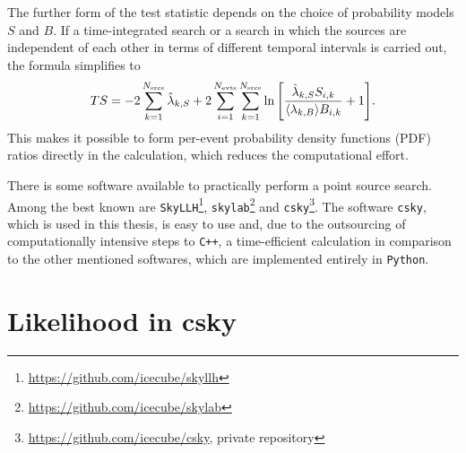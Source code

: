 The further form of the test statistic depends on the choice of probability models $S$ and $B$.
If a time-integrated search or a search in which the sources are independent of each other in terms of different temporal intervals is carried out, the formula simplifies to
\begin{equation}
    TS = -2\sum_{k=1}^{N_{\text{srcs}}}\hat\lambda_{k,S} + 2\sum_{i=1}^{N_{\text{evts}}}\sum_{k=1}^{N_{\text{srcs}}}\ln{\left[ \frac{\hat\lambda_{k,S}S_{i,k}}{\langle\lambda_{k,B}\rangle B_{i,k}}+1 \right]}. \label{eq:ts_simple}
\end{equation}
This makes it possible to form per-event probability density functions (PDF) ratios directly in the calculation, which reduces the computational effort.

There is some software available to practically perform a point source search.
Among the best known are \texttt{SkyLLH}\footnote{\url{https://github.com/icecube/skyllh}}, \texttt{skylab}\footnote{\url{https://github.com/icecube/skylab}} and \texttt{csky}\footnote{\url{https://github.com/icecube/csky}, private repository}.
The software \texttt{csky}, which is used in this thesis, is easy to use and, due to the outsourcing of computationally intensive steps to \texttt{C++}, a time-efficient calculation in comparison to the other mentioned softwares, which are implemented entirely in \texttt{Python}.

\section{Likelihood in csky}

